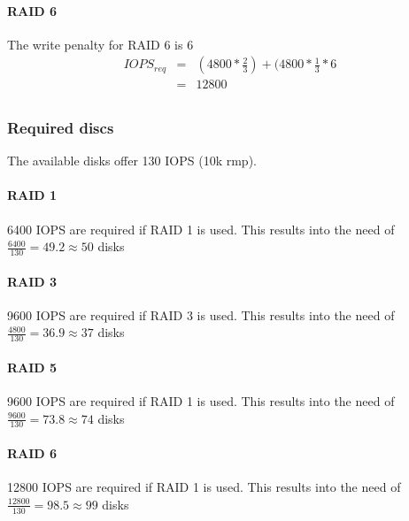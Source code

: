 \documentclass{article}
\begin{document}
\paragraph{RAID 6}
The write penalty for RAID 6 is 6
\begin{eqnarray*}
	IOPS_{req} &=&  (4800 * \frac{2}{3}) + (4800 * \frac{1}{3} * 6  \\
		   &=&  12800
\end{eqnarray*}
\subsection{}
\subsubsection*{Required discs}
The available disks offer 130 IOPS (10k rmp).
\paragraph{RAID 1}
6400 IOPS are required if RAID 1 is used. This results into the need of $\frac{6400}{130} = 49.2 \approx 50$ disks
\paragraph{RAID 3}
9600 IOPS are required if RAID 3 is used. This results into the need of $\frac{4800}{130} = 36.9 \approx 37$ disks
\paragraph{RAID 5}
9600 IOPS are required if RAID 1 is used. This results into the need of $\frac{9600}{130} = 73.8 \approx 74$ disks
\paragraph{RAID 6}
12800 IOPS are required if RAID 1 is used. This results into the need of $\frac{12800}{130} = 98.5 \approx 99$ disks
\end{document}
